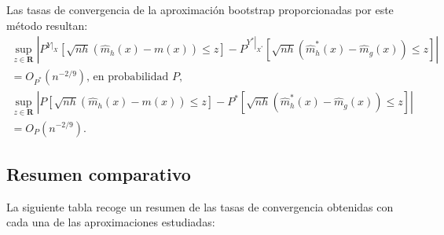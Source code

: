\documentclass[
]{book}
\theoremstyle{break}
\theoremstyle{definition}
\theoremstyle{definition}
\theoremstyle{definition}
\theoremstyle{remark}
\begin{document}
Las tasas de convergencia de la aproximación bootstrap proporcionadas
por este método resultan:
\[\begin{gathered}
\sup_{z\in \boldsymbol{R}}\left\vert P^{\left. Y\right\vert _{X}}\left[ 
\sqrt{nh}\left( \hat{m}_{h}\left( x \right) -m\left( x \right) \right) \leq z
\right]  -P^{\left. Y^{\ast}\right\vert _{X^{\ast}}}\left[ \sqrt{nh}\left( 
\hat{m}_{h}^{\ast}\left( x \right) -\hat{m}_{g}\left( x \right) \right) \leq z
\right] \right\vert \\
=O_{P^{\ast}}\left( n^{-2/9} \right) \text{, en probabilidad }P, \\
\sup_{z\in \boldsymbol{R}}\left\vert P\left[ \sqrt{nh}\left( \hat{m}
_{h}\left( x \right) -m\left( x \right) \right) \leq z\right] -P^{\ast}\left[ 
\sqrt{nh}\left( \hat{m}_{h}^{\ast}\left( x \right) -\hat{m}_{g}\left(
x \right) \right) \leq z\right] \right\vert \\
=O_{P}\left( n^{-2/9} \right).
\end{gathered}\]

\hypertarget{resumen-comparativo}{%
\subsection{Resumen comparativo}\label{resumen-comparativo}}

La siguiente tabla recoge un resumen de las tasas de convergencia
obtenidas con cada una de las aproximaciones estudiadas:
\end{document}
